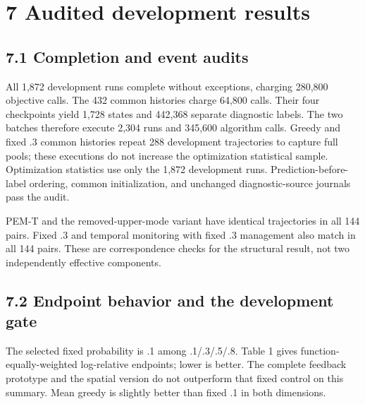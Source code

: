 \documentclass[11pt,a4paper]{article}
\begin{document}
\hypertarget{audited-development-results}{%
\section{7 Audited development
results}\label{audited-development-results}}

\hypertarget{completion-and-event-audits}{%
\subsection{7.1 Completion and event
audits}\label{completion-and-event-audits}}

All 1,872 development runs complete without exceptions, charging 280,800
objective calls. The 432 common histories charge 64,800 calls. Their
four checkpoints yield 1,728 states and 442,368 separate diagnostic
labels. The two batches therefore execute 2,304 runs and 345,600
algorithm calls. Greedy and fixed .3 common histories repeat 288
development trajectories to capture full pools; these executions do not
increase the optimization statistical sample. Optimization statistics
use only the 1,872 development runs. Prediction-before-label ordering,
common initialization, and unchanged diagnostic-source journals pass the
audit.

PEM-T and the removed-upper-mode variant have identical trajectories in
all 144 pairs. Fixed .3 and temporal monitoring with fixed .3 management
also match in all 144 pairs. These are correspondence checks for the
structural result, not two independently effective components.

\hypertarget{endpoint-behavior-and-the-development-gate}{%
\subsection{7.2 Endpoint behavior and the development
gate}\label{endpoint-behavior-and-the-development-gate}}

The selected fixed probability is .1 among .1/.3/.5/.8. Table 1 gives
function-equally-weighted log-relative endpoints; lower is better. The
complete feedback prototype and the spatial version do not outperform
that fixed control on this summary. Mean greedy is slightly better than
fixed .1 in both dimensions.
\end{document}
